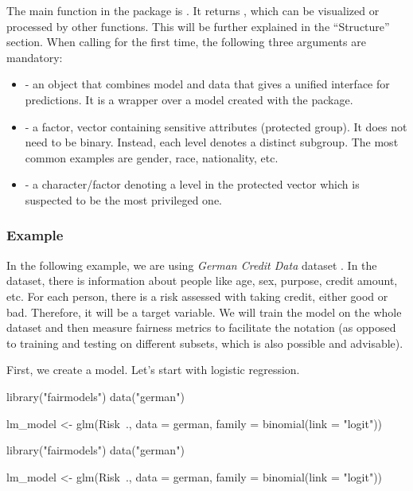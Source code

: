 The main function in the  package is
. It returns , which
can be visualized or processed by other functions. This will be further
explained in the ``Structure'' section. When calling
 for the first time, the following three
arguments are mandatory:

\begin{itemize}
\tightlist
\item
   - an object that combines model and data that gives
  a unified interface for predictions. It is a wrapper over a model
  created with the  \citep{JMLRv19} package.
\item
   - a factor, vector containing sensitive attributes
  (protected group). It does not need to be binary. Instead, each level
  denotes a distinct subgroup. The most common examples are gender,
  race, nationality, etc.
\item
   - a character/factor denoting a level in the
  protected vector which is suspected to be the most privileged one.
\end{itemize}

\hypertarget{example}{%
\subsubsection{Example}\label{example}}

In the following example, we are using \emph{German Credit Data} dataset
\citep{Dua2019}. In the dataset, there is information about people like
age, sex, purpose, credit amount, etc. For each person, there is a risk
assessed with taking credit, either good or bad. Therefore, it will be a
target variable. We will train the model on the whole dataset and then
measure fairness metrics to facilitate the notation (as opposed to
training and testing on different subsets, which is also possible and
advisable).

First, we create a model. Let's start with logistic regression.

\begin{example}
library("fairmodels")
data("german")

lm_model <- glm(Risk~., data = german, family = binomial(link = "logit"))
\end{example}

\begin{example}
library("fairmodels")
data("german")

lm_model <- glm(Risk~., data = german, family = binomial(link = "logit"))
\end{example}

